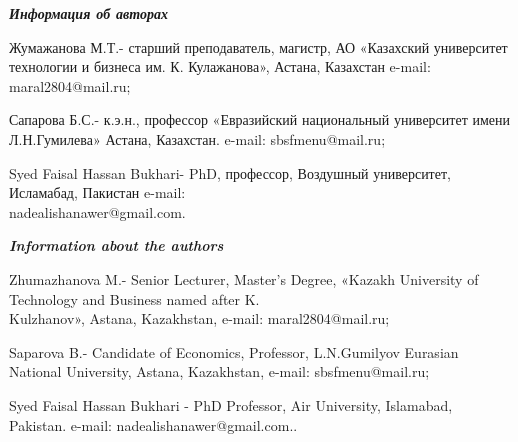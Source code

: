 \begin{authorinfo}
\hspace{1em}\emph{{\bfseries Информация об авторах}}

Жумажанова М.Т.- старший преподаватель, магистр, АО «Казахский
университет технологии и бизнеса им. К. Кулажанова», Астана, Казахстан
e-mail: maral2804@mail.ru;

Сапарова Б.С.- к.э.н., профессор «Евразийский национальный университет
имени Л.Н.Гумилева» Астана, Казахстан. e-mail: sbsfmenu@mail.ru;

Syed Faisal Hassan Bukhari- PhD, профессор, Воздушный университет,
Исламабад, Пакистан e-mail: \\nadealishanawer@gmail.com.

\hspace{1em}\emph{{\bfseries Information about the authors}}

Zhumazhanova M.- Senior Lecturer, Master's Degree, «Kazakh University of
Technology and Business named after K. \\Kulzhanov», Astana, Kazakhstan,
e-mail: maral2804@mail.ru;

Saparova B.- Candidate of Economics, Professor, L.N.Gumilyov Eurasian
National University, Astana, Kazakhstan, e-mail: sbsfmenu@mail.ru;

Syed Faisal Hassan Bukhari - PhD Professor, Air University, Islamabad,
Pakistan. e-mail: nadealishanawer@gmail.com..
\end{authorinfo}
